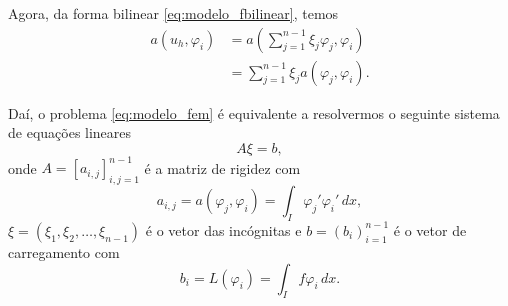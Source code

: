 Agora, da forma bilinear \eqref{eq:modelo_fbilinear}, temos
\begin{align}
  a(u_h,\varphi_i) &= a\left(\sum_{j=1}^{n-1}\xi_j\varphi_j,\varphi_i\right)\\
  &= \sum_{j=1}^{n-1}\xi_j a(\varphi_j,\varphi_i).
\end{align}

Daí, o problema \eqref{eq:modelo_fem} é equivalente a resolvermos o seguinte sistema de equações lineares
\begin{equation}\label{eq:modelo_fem_sis}
  A\xi = b,
\end{equation}
onde $A = [a_{i,j}]_{i,j=1}^{n-1}$ é a matriz de rigidez com
\begin{equation}
  a_{i,j} = a(\varphi_j,\varphi_i) = \int_{I}\varphi_j'\varphi_i'\,dx,
\end{equation}
$\xi = (\xi_1,\xi_2,\dotsc,\xi_{n-1})$ é o vetor das incógnitas e $b = (b_{i})_{i=1}^{n-1}$ é o vetor de carregamento com
\begin{equation}
  b_i = L(\varphi_i) = \int_If \varphi_i\,dx.
\end{equation}

